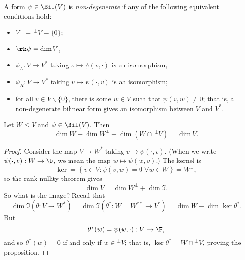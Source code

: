 \begin{definition}
	A form $\psi\in\Bil(V)$ is \emph{non-degenerate} if any of the following equivalent conditions hold: %
	\begin{itemize}
		\shortskip
		\item $V^\perp = \,^\perp V = \{0\}$;
		\item $\rk\psi=\dim V$;
		\item $\psi_L:V\to V^*$ taking $v\mapsto \psi(v,\cdot)$ is an isomorphism;
		\item $\psi_R:V\to V^*$ taking $v\mapsto \psi(\cdot,v)$ is an isomorphism;
		\item for all $v\in V\backslash\{0\}$, there is some $w\in V$ such that $\psi(v,w)\neq 0$; that is, a non-degenerate bilinear form gives an isomorphism between $V$ and $V^*$. %
	\end{itemize}
\end{definition}

	\pagebreak

\begin{proposition}
	Let $W\leq V$ and $\psi\in\Bil(V)$. Then %
	\begin{equation*}
		\dim W + \dim W^\perp - \dim(W\cap \,^\perp V) = \dim V.
	\end{equation*}
\end{proposition}

\begin{proof}
	Consider the map $V\to W^*$ taking $v\mapsto\psi(\cdot,v)$. (When we write $\psi(\cdot,v):W\to\F$, we mean the map $w\mapsto\psi(w,v)$.) The kernel is %
	\begin{equation*}
		\ker = \left\{v\in V : \psi(v,w)=0 \;\forall w\in W\right\} = W^\perp,
	\end{equation*}
	so the rank-nullity theorem gives
	\begin{equation*}
		\dim V = \dim W^\perp + \dim\Im.
	\end{equation*}
	So what is the image? Recall that
	\begin{equation*}
		\dim \Im(\theta:V\to W^*)
		= \dim\Im(\theta^*:W = W^{**} \to V^*)
		= \dim W - \dim\ker\theta^*.
	\end{equation*}
	But 
	\begin{equation*}
		\theta^*(w) = \psi(w,\cdot):V\to\F,
	\end{equation*}
	and so $\theta^*(w)=0$ if and only if $w\in{}^\perp V$; that is, $\ker\theta^* = W \cap {}^\perp V$, proving the proposition. %
\end{proof}

